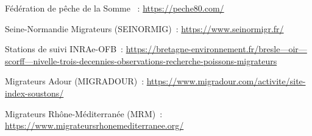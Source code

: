 \documentclass[11pt,twocolumn,titlepage,twoside]{article}\usepackage[]{graphicx}\usepackage[]{color}
\begin{document}
Fédération de pêche de la Somme ~: 
\href{https://peche80.com/}{{https://peche80.com/}}

Seine-Normandie Migrateurs (SEINORMIG)~:    
\href{https://www.seinormigr.fr/}{{https://www.seinormigr.fr/}}

Stations de suivi INRAe-OFB~:      
\href{https://bretagne-environnement.fr/bresle---oir---scorff---nivelle-trois-decennies-observations-recherche-poissons-migrateurs}{{https://bretagne-environnement.fr/bresle---oir---scorff---nivelle-trois-decennies-observations-recherche-poissons-migrateurs}}

Migrateurs Adour (MIGRADOUR)~:                          
\href{https://www.migradour.com/activite/site-index-soustons/}{{https://www.migradour.com/activite/site-index-soustons/}}

Migrateurs Rhône-Méditerranée (MRM)~:            
\href{https://www.migrateursrhonemediterranee.org/}{{https://www.migrateursrhonemediterranee.org/}}



\printbibliography

\clearpage
\end{document}

